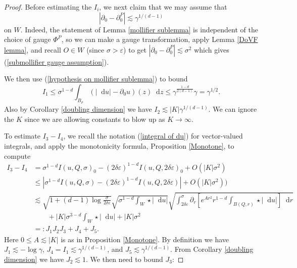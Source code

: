 \documentclass[reqno,11pt]{amsart}
\newcommand*\dif{\mathop{}\!\mathrm{d}}
\theoremstyle{definition}
\numberwithin{equation}{section}
\begin{document}
\begin{proof}
Before estimating the $I_i$, we next claim that we may assume that
\begin{equation}\label{submollifier gauge assumption}
|\partial_0 - \partial_0^P| \lesssim \gamma^{1/(d - 1)}
\end{equation}
on $W$. Indeed, the statement of Lemma \ref{mollifier sublemma} is independent of the choice of gauge $\Phi^P$, so we can make a gauge transformation, apply Lemma \ref{DoVF lemma}, and recall $O \in W$ (since $\sigma > \varepsilon$) to get $|\partial_0 - \partial_0^P| \lesssim \sigma^2$
which gives (\ref{submollifier gauge assumption}).

We then use (\ref{hypothesis on mollifier sublemma}) to bound
$$I_1 \leq \sigma^{1 - d} \int_{B_\rho} (|\dif u| - \partial_0 u)(z) \dif z \leq \gamma^{\frac{1 - d}{2(d - 1)}} \gamma = \gamma^{1/2}.$$
Also by Corollary \ref{doubling dimension} we have $I_2 \lesssim |K| \gamma^{1/(d - 1)}$.
We can ignore the $K$ since we are allowing constants to blow up as $K \to \infty$.

To estimate $I_3 - I_4$, we recall the notation (\ref{integral of du}) for vector-valued integrals, and apply the monotonicity formula, Proposition \ref{Monotone}, to compute
\begin{align*}
    I_3 - I_4 &= \sigma^{1 - d} I(u, Q, \sigma)_0 - (2 \delta \varepsilon)^{1 - d} I(u, Q, 2\delta\varepsilon)_0 + O(|K| \sigma^2) \\
    &\leq |\sigma^{1 - d} I(u, Q, \sigma) - (2 \delta \varepsilon)^{1 - d} I(u, Q, 2 \delta \varepsilon)| + O(|K| \sigma^2)) \\
    &\lesssim \sqrt{1 + (d - 1) \log \frac{\sigma}{2\delta\varepsilon}} \sqrt{\sigma^{1 - d} \int_W \star |\dif u|} \sqrt{\int_{2\delta\varepsilon}^\sigma \partial_r \left[e^{Ar^2} r^{1 - d} \int_{B(Q, r)} \star |\dif u|\right] \dif r}\\
&\qquad + |K| \sigma^{3 - d} \int_W \star |\dif u| + |K| \sigma^2 \\
&=: J_1 J_2 J_3 + J_4 + J_5.
\end{align*}
Here $0 \leq A \lesssim |K|$ is as in Proposition \ref{Monotone}.
By definition we have $J_1 \lesssim -\log \gamma$, $J_4 = I_1 \lesssim \gamma^{1/(d - 1)}$, and $J_5 \lesssim \gamma^{1/(d - 1)}$.
From Corollary \ref{doubling dimension} we have $J_2 \lesssim 1$.
We then need to bound $J_3$:


\end{proof}
\end{document}
